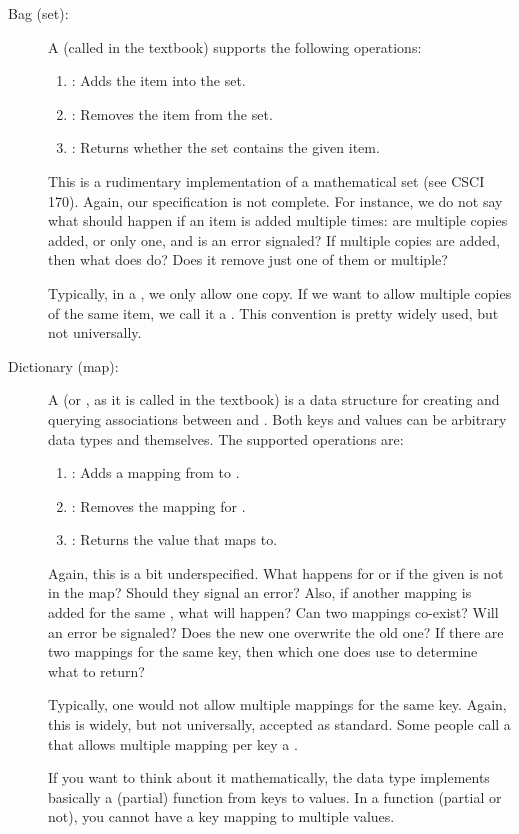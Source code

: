 \begin{description}
\item[Bag (set):] 
A  (called  in the textbook) supports the
following operations:
\begin{enumerate}
\item {}: Adds the item into the set.
\item {}: Removes the item from the set.
\item {}: Returns whether the set contains
  the given item.
\end{enumerate}

This is a rudimentary implementation of a mathematical set (see CSCI 170).
Again, our specification is not complete.
For instance, we do not say what should happen if an item is added multiple times:
are multiple copies added, or only one, and is an error signaled?
If multiple copies are added, then what does  do?
Does it remove just one of them or multiple?

Typically, in a , we only allow one copy.
If we want to allow multiple copies of the same item,
we call it a .
This convention is pretty widely used, but not universally.

\item[Dictionary (map):]
A  (or , as it is called in the textbook)
is a data structure for creating and querying associations between
 and .
Both keys and values can be arbitrary data types  and
 themselves.
The supported operations are: 

\begin{enumerate}
\item {}:
  Adds a mapping from  to .
\item {}:
  Removes the mapping for .
\item {}:
  Returns the value that  maps to.
\end{enumerate}

Again, this is a bit underspecified.
What happens for  or  if the given  is not in the map? 
Should they signal an error?
Also, if another mapping is added for the same , what will
happen? Can two mappings co-exist? Will an error be signaled? Does the
new one overwrite the old one?
If there are two mappings for the same key, then which one does
 use to determine what to return?

Typically, one would not allow multiple mappings for the same key.
Again, this is widely, but not universally, accepted as standard.
Some people call a  that allows multiple mapping per key a
.

If you want to think about it mathematically, 
the  data type implements basically a (partial) function from
keys to values.
In a function (partial or not), you cannot have a key mapping to
multiple values.
\end{description}


